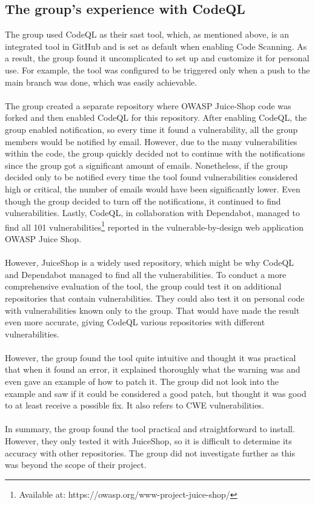 \subsection{The group's experience with CodeQL}
The group used CodeQL as their \acrshort{sast} tool, which, as mentioned above, is an integrated tool in GitHub and is set as default when enabling Code Scanning. As a result, the group found it uncomplicated to set up and customize it for personal use. For example, the tool was configured to be triggered only when a push to the main branch was done, which was easily achievable. 
\\~\\
The group created a separate repository where OWASP Juice-Shop code was forked and then enabled CodeQL for this repository. After enabling CodeQL, the group enabled notification, so every time it found a vulnerability, all the group members would be notified by email. However, due to the many vulnerabilities within the code, the group quickly decided not to continue with the notifications since the group got a significant amount of emails. Nonetheless, if the group decided only to be notified every time the tool found vulnerabilities considered high or critical, the number of emails would have been significantly lower. Even though the group decided to turn off the notifications, it continued to find vulnerabilities. Lastly, CodeQL, in collaboration with Dependabot, managed to find all 101 vulnerabilities\footnote{Available at: https://owasp.org/www-project-juice-shop/} reported in the vulnerable-by-design web application OWASP Juice Shop. 
\\~\\
However, JuiceShop is a widely used repository, which might be why CodeQL and Dependabot managed to find all the vulnerabilities. To conduct a more comprehensive evaluation of the tool, the group could test it on additional repositories that contain vulnerabilities. They could also test it on personal code with vulnerabilities known only to the group. That would have made the result even more accurate, giving CodeQL various repositories with different vulnerabilities.
\\~\\
However, the group found the tool quite intuitive and thought it was practical that when it found an error, it explained thoroughly what the warning was and even gave an example of how to patch it. The group did not look into the example and saw if it could be considered a good patch, but thought it was good to at least receive a possible fix. It also refers to CWE vulnerabilities. 
\\~\\
In summary, the group found the tool practical and straightforward to install. However, they only tested it with JuiceShop, so it is difficult to determine its accuracy with other repositories. The group did not investigate further as this was beyond the scope of their project.

